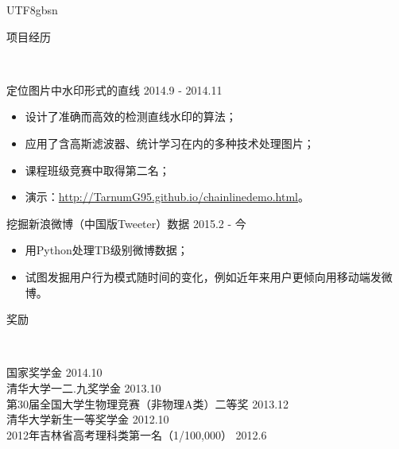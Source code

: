 \documentclass[9pt]{article}
\newenvironment{changemargin}[2]{%
  \begin{list}{}{%
    \setlength{\topsep}{0pt}%
    \setlength{\leftmargin}{#1}%
    \setlength{\rightmargin}{#2}%
    \setlength{\listparindent}{\parindent}%
    \setlength{\itemindent}{\parindent}%
    \setlength{\parsep}{\parskip}%
  }%
  \item[]}{\end{list}
}
\newcommand{\lineover}{
	\begin{changemargin}{-0.05in}{-0.05in}
		\vspace*{-8pt}
		\hrulefill \\
		\vspace*{-2pt}
	\end{changemargin}
}
\newcommand{\header}[1]{
	\begin{changemargin}{-0.5in}{-0.5in}
		\scshape{#1}\\
  	\lineover
	\end{changemargin}
}
\newenvironment{body} {
	\vspace*{-16pt}
	\begin{changemargin}{-0.25in}{-0.5in}
  }	
	{\end{changemargin}
}
\begin{document}
\begin{CJK*}{UTF8}{gbsn}
\header{项目经历}

\begin{body}
	\vspace{14pt}
	定位图片中水印形式的直线 \hfill 2014.9 - 2014.11
	\begin{itemize}
	\itemsep 0pt
	\item 设计了准确而高效的检测直线水印的算法；
	\item 应用了含高斯滤波器、统计学习在内的多种技术处理图片；
	\item 课程班级竞赛中取得第二名；
	\item 演示：\href{http://TarnumG95.github.io/chainlinedemo.html}{http://TarnumG95.github.io/chainlinedemo.html}。
	\end{itemize}
	\smallskip
	挖掘新浪微博（中国版Tweeter）数据 \hfill 2015.2 - 今
	\begin{itemize}
	\itemsep 0pt
	\item 用Python处理TB级别微博数据；
	\item  试图发掘用户行为模式随时间的变化，例如近年来用户更倾向用移动端发微博。
	\end{itemize}
	\smallskip

\end{body}
\smallskip
\smallskip

\header{奖励}

\begin{body}
	\vspace{14pt}
	国家奖学金 \hfill{} 2014.10\\
	\smallskip
	清华大学一二.九奖学金 \hfill{} 2013.10\\
	\smallskip
	第30届全国大学生物理竞赛（非物理A类）二等奖 \hfill{} 2013.12\\
	
	\smallskip
	清华大学新生一等奖学金 \hfill{} 2012.10\\
	\smallskip
	2012年吉林省高考理科类第一名（1/100,000） \hfill{} 2012.6
\end{body}

\smallskip
\smallskip




\end{CJK*}
\end{document}
